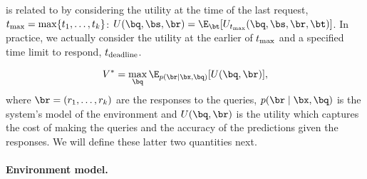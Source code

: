  is related to  by considering the utility at the time of the last request, $t_\text{max} = \max\{t_1, \ldots, t_k\}$: $U(\bq, \bs, \br) = \E_{\bt}[U_{\tmax}(\bq, \bs, \br, \bt)]$.
In practice, we actually consider the utility at the earlier of $t_\text{max}$ and a specified time limit to respond, $t_\text{deadline}$.


\begin{align}
  \label{eqn:value}
V^* = \max_{\bq} \E_{p(\br \mid \bx, \bq)}[U(\bq, \br)],
\end{align}
where $\br = (r_1, \ldots, r_k)$ are the responses to the queries, $p(\br \mid \bx, \bq)$ is the system's model of the environment and $U(\bq, \br)$ is the utility which captures the cost of making the queries and the accuracy of the predictions given the responses. 
We will define these latter two quantities next.







\paragraph{Environment model.}

